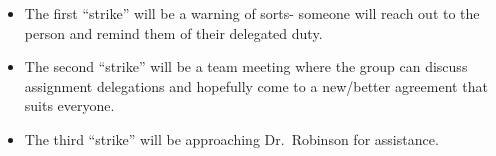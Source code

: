 \documentclass[
  letterpaper,
  DIV=11,
  numbers=noendperiod]{scrartcl}
\begin{document}
\begin{itemize}
  \begin{itemize}
  \item
    The first ``strike'' will be a warning of sorts- someone will reach
    out to the person and remind them of their delegated duty.
  \item
    The second ``strike'' will be a team meeting where the group can
    discuss assignment delegations and hopefully come to a new/better
    agreement that suits everyone.
  \item
    The third ``strike'' will be approaching Dr.~Robinson for
    assistance.
  \end{itemize}
\end{itemize}
\end{document}
